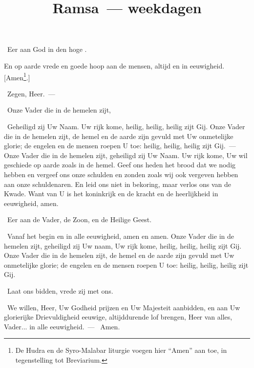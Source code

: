 \documentclass[12pt,twoside,a5paper]{article}
\begin{document}
\title{Ramsa~--- weekdagen}
\author{}
\date{}
\maketitle


\begin{halfparskip}
  \cc~Eer aan God in den hoge .

  En op aarde vrede en goede hoop aan de mensen, altijd en in eeuwigheid. [Amen\footnote{De Hudra en de Syro-Malabar liturgie voegen hier ``Amen'' aan toe, in tegenstelling tot Breviarium.}.]

  \rr~Zegen, Heer.~--- 

  \cc~Onze Vader die in de hemelen zijt,

  \rr~Geheiligd zij Uw Naam. Uw rijk kome, heilig, heilig, heilig zijt Gij. Onze Vader die in de hemelen zijt, de hemel en de aarde zijn gevuld met Uw onmetelijke glorie; de engelen en de mensen roepen U toe: heilig, heilig, heilig zijt Gij.~--- Onze Vader die in de hemelen zijt, geheiligd zij Uw Naam. Uw rijk kome, Uw wil geschiede op aarde zoals in de hemel. Geef ons heden het brood dat we nodig hebben en vergeef ons onze schulden en zonden zoals wij ook vergeven hebben aan onze schuldenaren. En leid ons niet in bekoring, maar verlos ons van de Kwade. Want van U is het koninkrijk en de kracht en de heerlijkheid in eeuwigheid, amen.

  \cc~Eer aan de Vader, de Zoon, en de Heilige Geest.

  \rr~Vanaf het begin en in alle eeuwigheid, amen en amen. Onze Vader die in de hemelen zijt, geheiligd zij Uw naam, Uw rijk kome, heilig, heilig, heilig zijt Gij. Onze Vader die in de hemelen zijt, de hemel en de aarde zijn gevuld met Uw onmetelijke glorie; de engelen en de mensen roepen U toe: heilig, heilig, heilig zijt Gij.

  \dd~Laat ons bidden, vrede zij met ons.

  \cc~We willen, Heer, Uw Godheid prijzen  en Uw Majesteit aanbidden, en aan Uw glorierijke Drievuldigheid eeuwige, altijddurende lof brengen, Heer van alles, Vader... in alle eeuwigheid.~--- \rr~Amen.
\end{halfparskip}

\end{document}
